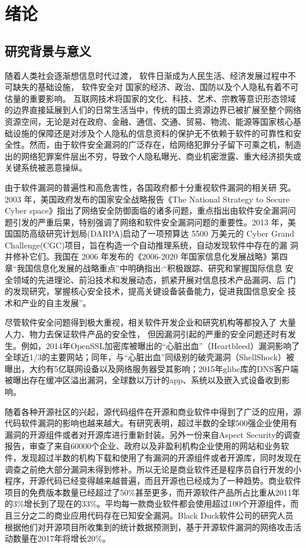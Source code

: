 \chapter{绪论}
\section{研究背景与意义}
随着人类社会逐渐想信息时代过渡， %
软件日渐成为人民生活、经济发展过程中不可缺失的基础设施， %
软件安全对
国家的经济、政治、国防以及个人隐私有着不可估量的重要影响。
互联网技术将国家的文化、科技、艺术、宗教等意识形态领域的边界直接延展到人们的日常生活当中，传统的国土资源边界已被扩展至整个网络资源空间，无论是对在政府、金融、通信、交通、贸易、物流、能源等国家核心基础设施的保障还是对涉及个人隐私的信息资料的保护无不依赖于软件的可靠性和安全性。然而，由于软件安全漏洞的广泛存在，给网络犯罪分子留下可乘之机，制造出的网络犯罪案件层出不穷，导致个人隐私曝光、商业机密泄露、重大经济损失或关键系统被恶意操纵。

由于软件漏洞的普遍性和高危害性，各国政府都十分重视软件漏洞的相关研
究。2003 年，美国政府发布的国家安全战略报告《The National Strategy to Secure
Cyber space》指出了网络安全防御面临的诸多问题，重点指出由软件安全漏洞问
题引发的严重后果，特别强调了网络和软件安全漏洞问题的重要性。2013 年，美
国国防高级研究计划局(DARPA)启动了一项预算达 5500 万美元的 Cyber Grand
Challenge(CGC)项目，旨在构造一个自动推理系统，自动发现软件中存在的漏
洞并修补它们。我国在 2006 年发布的《2006-2020 年国家信息化发展战略》第四
章“我国信息化发展的战略重点”中明确指出:“积极跟踪、研究和掌握国际信息
安全领域的先进理论、前沿技术和发展动态，抓紧开展对信息技术产品漏洞、后
门的发现研究，掌握核心安全技术，提高关键设备装备能力，促进我国信息安全
技术和产业的自主发展”。

尽管软件安全问题得到极大重视，相关软件开发企业和研究机构等都投入了
大量人力、物力去保证软件产品的安全性，
但因漏洞引起的严重的安全问题还时有发生。例如，2014年OpenSSL加密库被曝出的“心脏出血”（Heartbleed）漏洞影响了全球近1/3的主要网站；同年，与“心脏出血”同级别的破壳漏洞（ShellShock）被曝出，大约有5亿联网设备以及网络服务器受其影响；2015年glibc库的DNS客户端被曝出存在缓冲区溢出漏洞，全球数以万计的app、系统以及嵌入式设备收到影响。

随着各种开源社区的兴起，源代码组件在开源和商业软件中得到了广泛的应用，源代码软件漏洞的影响也越来越大。有研究表明，超过半数的全球500强企业使用有漏洞的开源组件或者对开源库进行重新封装。另外一份来自Aspect Security的调查报告，审查了来自60000个企业、政府以及非盈利机构企业使用的网站和业务软件，发现超过半数的机构下载和使用了有漏洞的开源组件或者开源库，同时发现在调查之前绝大部分漏洞未得到修补。所以无论是商业软件还是程序员自行开发的小程序，开源代码已经变得越来越普遍，而且开源也已经成为了一种趋势。商业软件项目的免费版本数量已经超过了50\%甚至更多，而开源软件产品所占比重从2011年的3\%增长到了现在的33\%。平均每一款商业软件都会使用超过100个开源组件，而且三分之二的商业应用代码存在已知安全漏洞。Black Duck软件公司的研究人员根据他们对开源项目所收集到的统计数据预测到，基于开源软件漏洞的网络攻击活动数量在2017年将增长20\%。

